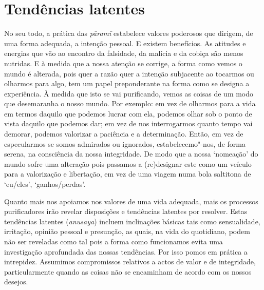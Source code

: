 \section{Tendências latentes}

No seu todo, a prática das \emph{pāramī} estabelece valores poderosos que
dirigem, de uma forma adequada, a intenção pessoal. E existem benefícios. As
atitudes e energias que vão ao encontro da falsidade, da malícia e da cobiça são
menos nutridas. E à medida que a nossa atenção se corrige, a forma como vemos o
mundo é alterada, pois quer a razão quer a intenção subjacente ao tocarmos ou
olharmos para algo, tem um papel preponderante na forma como se designa a
experiência. À medida que isto se vai purificando, vemos as coisas de um modo
que desemaranha o nosso mundo. Por exemplo: em vez de olharmos para a vida em
termos daquilo que podemos lucrar com ela, podemos olhar sob o ponto de vista
daquilo que podemos dar; em vez de nos interrogarmos quanto tempo vai demorar,
podemos valorizar a paciência e a determinação. Então, em vez de especularmos se
somos admirados ou ignorados, estabelecemo"-nos, de forma serena, na consciência
da nossa integridade. De modo que a nossa `nomeação' do mundo sofre uma
alteração pois passamos a (re)designar este como um veículo para a valorização e
libertação, em vez de uma viagem numa bola saltitona de `eu/eles',
`ganhos/perdas'.

Quanto mais nos apoiamos nos valores de uma vida adequada, mais os processos
purificadores irão revelar disposições e tendências latentes por resolver. Estas
tendências latentes (\emph{anusaya}) incluem inclinações básicas tais como
sensualidade, irritação, opinião pessoal e presunção, as quais, na vida do
quotidiano, podem não ser reveladas como tal pois a forma como funcionamos evita
uma investigação aprofundada das nossas tendências. Por isso pomos em prática a
intrepidez. Assumimos compromissos relativos a actos de valor e de integridade,
particularmente quando as coisas não se encaminham de acordo com os nossos
desejos.

